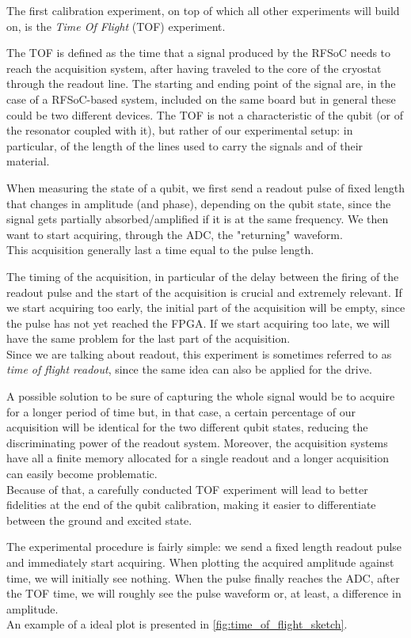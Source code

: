 The first calibration experiment, on top of which all other experiments will build on, is the \textit{Time Of Flight} (TOF) experiment.

The TOF is defined as the time that a signal produced by the RFSoC needs to reach the acquisition system, after having traveled to the core of the cryostat through the readout line.
The starting and ending point of the signal are, in the case of a RFSoC-based system, included on the same board but in general these could be two different devices.
The TOF is not a characteristic of the qubit (or of the resonator coupled with it), but rather of our experimental setup: in particular, of the length of the lines used to carry the signals and of their material.

When measuring the state of a qubit, we first send a readout pulse of fixed length that changes in amplitude (and phase), depending on the qubit state, since the signal gets partially absorbed/amplified if it is at the same frequency.
We then want to start acquiring, through the ADC, the "returning" waveform.\\
This acquisition generally last a time equal to the pulse length.

The timing of the acquisition, in particular of the delay between the firing of the readout pulse and the start of the acquisition is crucial and extremely relevant.
If we start acquiring too early, the initial part of the acquisition will be empty, since the pulse has not yet reached the FPGA.
If we start acquiring too late, we will have the same problem for the last part of the acquisition.\\
Since we are talking about readout, this experiment is sometimes referred to as \textit{time of flight readout}, since the same idea can also be applied for the drive.

A possible solution to be sure of capturing the whole signal would be to acquire for a longer period of time but, in that case, a certain percentage of our acquisition will be identical for the two different qubit states, reducing the discriminating power of the readout system.
Moreover, the acquisition systems have all a finite memory allocated for a single readout and a longer acquisition can easily become problematic.\\
Because of that, a carefully conducted TOF experiment will lead to better fidelities at the end of the qubit calibration, making it easier to differentiate between the ground and excited state.

The experimental procedure is fairly simple: we send a fixed length readout pulse and immediately start acquiring.
When plotting the acquired amplitude against time, we will initially see nothing.
When the pulse finally reaches the ADC, after the TOF time, we will roughly see the pulse waveform or, at least, a difference in amplitude.\\
An example of a ideal plot is presented in \cref{fig:time_of_flight_sketch}.

